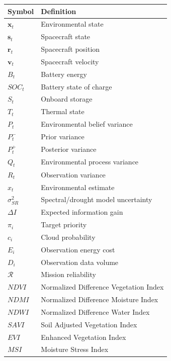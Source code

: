 \documentclass[11pt,a4paper]{article}
\newcommand{\vect}[1]{\bm{#1}}
\begin{document}
\begin{table}[!htbp]
\centering
\begin{tabularx}{\textwidth}{lX}
\toprule
Symbol & Definition\\
\midrule
$\vect x_t$ & Environmental state\\
$\vect s_t$ & Spacecraft state\\
$\vect r_t$ & Spacecraft position\\
$\vect v_t$ & Spacecraft velocity\\
$B_t$ & Battery energy\\
$SOC_t$ & Battery state of charge\\
$S_t$ & Onboard storage\\
$T_t$ & Thermal state\\
$P_t$ & Environmental belief variance\\
$P_t^-$ & Prior variance\\
$P_t^+$ & Posterior variance\\
$Q_t$ & Environmental process variance\\
$R_t$ & Observation variance\\
$\hat x_t$ & Environmental estimate\\
$\sigma^2_{SR}$ & Spectral/drought model uncertainty\\
$\Delta I$ & Expected information gain\\
$\pi_i$ & Target priority\\
$c_i$ & Cloud probability\\
$E_i$ & Observation energy cost\\
$D_i$ & Observation data volume\\
$\mathcal R$ & Mission reliability\\
$NDVI$ & Normalized Difference Vegetation Index\\
$NDMI$ & Normalized Difference Moisture Index\\
$NDWI$ & Normalized Difference Water Index\\
$SAVI$ & Soil Adjusted Vegetation Index\\
$EVI$ & Enhanced Vegetation Index\\
$MSI$ & Moisture Stress Index\\
\bottomrule
\end{tabularx}
\end{table}

\end{document}
